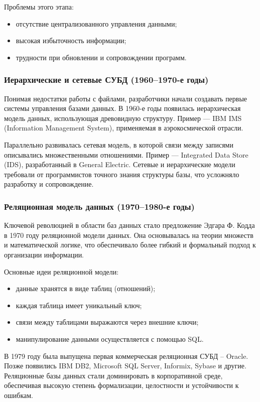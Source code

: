 Проблемы этого этапа:
\begin{itemize}
	\item отсутствие централизованного управления данными;
	\item высокая избыточность информации;
	\item трудности при обновлении и сопровождении программ.
\end{itemize}

\subsubsection{Иерархические и сетевые СУБД (1960–1970-е годы)}

Понимая недостатки работы с файлами, разработчики начали создавать первые системы управления базами данных. В 1960-е годы появилась иерархическая модель данных, использующая древовидную структуру. Пример — IBM IMS (Information Management System), применяемая в аэрокосмической отрасли.

Параллельно развивалась сетевая модель, в которой связи между записями описывались множественными отношениями. Пример — Integrated Data Store (IDS), разработанный в General Electric. Сетевые и иерархические модели требовали от программистов точного знания структуры базы, что усложняло разработку и сопровождение.

\subsubsection{Реляционная модель данных (1970–1980-е годы)}

Ключевой революцией в области баз данных стало предложение Эдгара Ф. Кодда в 1970 году реляционной модели данных. Она основывалась на теории множеств и математической логике, что обеспечивало более гибкий и формальный подход к организации информации.

Основные идеи реляционной модели:
\begin{itemize}
	\item данные хранятся в виде таблиц (отношений);
	\item каждая таблица имеет уникальный ключ;
	\item связи между таблицами выражаются через внешние ключи;
	\item манипулирование данными осуществляется с помощью SQL.
\end{itemize}

В 1979 году была выпущена первая коммерческая реляционная СУБД -- Oracle. Позже появились IBM DB2, Microsoft SQL Server, Informix, Sybase и другие. Реляционные базы данных стали доминировать в корпоративной среде, обеспечивая высокую степень формализации, целостности и устойчивости к ошибкам.

